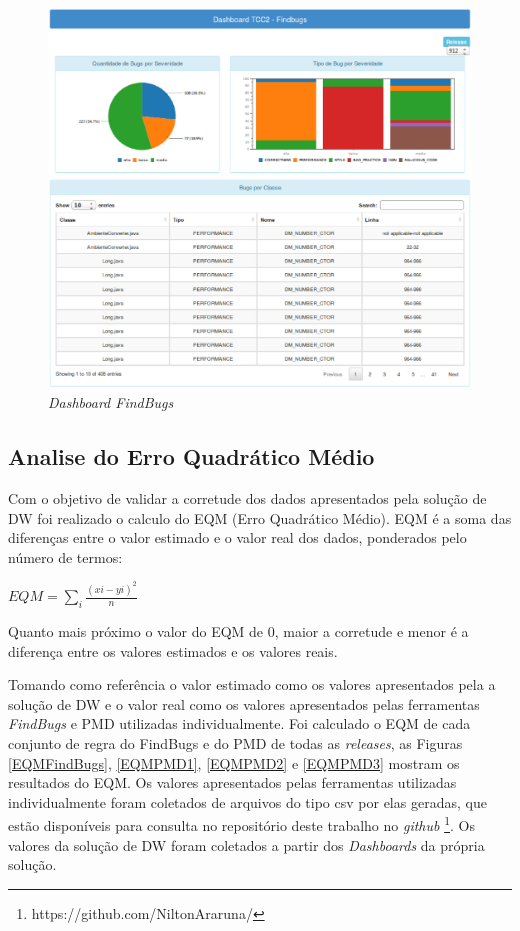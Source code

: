 \begin{figure}[h!]
\centering
\includegraphics[keepaspectratio=false,scale=0.5]{figuras/figuras_nilton/DashboardFindbugs.eps}
\caption{\textit{Dashboard FindBugs}}
\label{dashboardCenarios}
\end{figure}


\subsection{Analise do Erro Quadrático Médio}

Com o objetivo de validar a corretude dos dados apresentados pela solução de DW foi realizado o calculo do EQM (Erro Quadrático Médio). EQM é a soma das diferenças entre
o valor estimado e o valor real dos dados, ponderados pelo número de termos: 

$ EQM = \sum\limits_{i}\frac{(x{i}-y{i})^{2}}{n} $

Quanto mais próximo o valor do EQM de 0, maior a corretude e menor é a diferença entre os valores estimados e os valores reais.

Tomando como referência o valor estimado como os valores apresentados pela a solução de DW e o valor real como os valores apresentados pelas ferramentas \textit{FindBugs} e PMD utilizadas individualmente. Foi calculado o EQM de cada conjunto de regra do FindBugs e do PMD de todas as \textit{releases}, as Figuras \ref{EQMFindBugs}, \ref{EQMPMD1}, \ref{EQMPMD2} e \ref{EQMPMD3} mostram os resultados do EQM. Os valores apresentados pelas ferramentas utilizadas individualmente foram coletados de arquivos do tipo csv por elas geradas, que estão disponíveis para consulta no repositório deste trabalho no \textit{github} \footnote{https://github.com/NiltonAraruna/}. Os valores da solução de DW foram coletados a partir dos \textit{Dashboards} da própria solução. 

